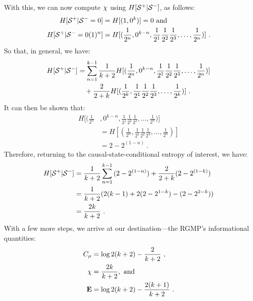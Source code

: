 With this, we can now compute $\chi$ using
$H[{\mathcal{S}}^{+} | {\mathcal{S}}^{-}]$, as follows:
\begin{align*}
H[{\mathcal{S}}^{+} | {\mathcal{S}}^{-} = 0] &=  H[(1, 0^k)] = 0 ~\mathrm{and}\\
H[{\mathcal{S}}^{+} | {\mathcal{S}}^{-} = 0(1)^n]
  &= H[(\frac{1}{2^{n}}, 0^{k-n}, \frac{1}{2^1} \frac{1}{2^2}
  \frac{1}{2^3}, \ldots,  \frac{1}{2^{n}})] ~.
\end{align*}
So that, in general, we have:
\begin{align*}
H[{\mathcal{S}}^{+} | {\mathcal{S}}^{-}]
  & = \sum_{n=1}^{k-1}{\frac{1}{k+2} H[(\frac{1}{2^{n}}, 0^{k-n},
  \frac{1}{2^1} \frac{1}{2^2} \frac{1}{2^3}, \ldots,  \frac{1}{2^{n}})]}\\
  & \quad
  + \frac{2}{2+k} H[(\frac{1}{2^{k}}, \frac{1}{2^1} \frac{1}{2^2} \frac{1}{2^3},
  \ldots,  \frac{1}{2^{k}})] ~.
\end{align*}
It can then be shown that:
\begin{align*}
H[(\frac{1}{2^{n}} & , 0^{k-n}, \frac{1}{2^1} \frac{1}{2^2} \frac{1}{2^3},
  \ldots, \frac{1}{2^{n}})] \\
  & = H[(\frac{1}{2^{n}}, \frac{1}{2^1} \frac{1}{2^2} \frac{1}{2^3}, \ldots,
  \frac{1}{2^{n}})] \\
  & = 2 - 2^{(1-n)} ~.
\end{align*}
Therefore, returning to the causal-state-conditional entropy of interest,
we have:
\begin{align*}
H[{\mathcal{S}}^{+} | {\mathcal{S}}^{-}] &=
  \frac{1}{k+2}\sum_{n=1}^{k-1}{(2 - 2^{(1-n)})} + \frac{2}{2+k} (2 - 2^{(1-k)})\\
  &= \frac{1}{k+2}(2(k-1) + 2(2-2^{1-k}) - (2-2^{2-k}))\\
  &= \frac{2k}{k+2} ~.
\end{align*}
With a few more steps, we arrive at our destination---the
RGMP's informational quantities:
\begin{align*}
C_\mu & = \log2(k+2) - \frac{2}{k+2} ~,\\ 
\chi  & = \frac{2k}{k+2}, ~\mathrm{and}\\
{\bf E}  & = \log2(k+2) - \frac{2(k+1)}{k+2} ~.
\end{align*}

